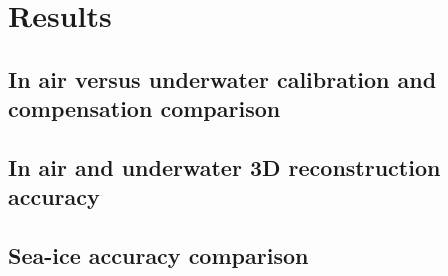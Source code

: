 \chapter{Results}
\label{ch:results}

\section{In air versus underwater calibration and compensation comparison}
\label{sec:ch6.calibration_comparison}


\section{In air and underwater 3D reconstruction accuracy}
\label{sec:ch6.reconstruction_accuracy}


\section{Sea-ice accuracy comparison}
\label{sec:ch6.seaice_accuracy}

